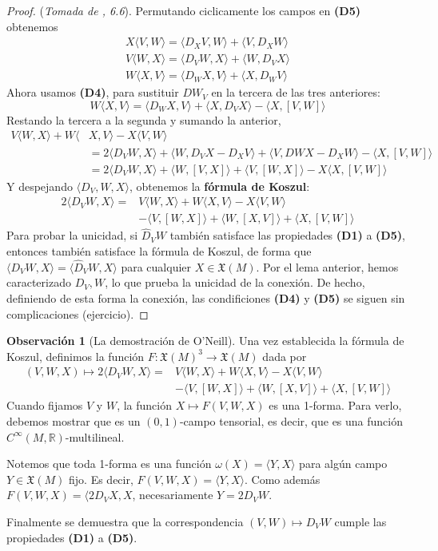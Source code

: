 \documentclass[spanish]{book}
\theoremstyle{definition}
\newtheorem*{obs}{Observación}
\newcommand{\R}{\mathbb{R}}
\newcommand{\X}{\mathfrak{X}}
\newcommand{\Cinf}{C^\infty}
\begin{document}
	
	\begin{proof}
		(\textit{Tomada de \cite{Loring-dif}, 6.6}). Permutando ciclicamente los campos en \textbf{(D5)} obtenemos
		\begin{align*}
			X\langle V,W\rangle=\langle D_XV,W\rangle+\langle V,D_XW\rangle\\
			V\langle W,X\rangle=\langle D_VW,X\rangle+\langle W,D_VX\rangle\\
			W\langle X,V\rangle=\langle D_WX,V\rangle+\langle X,D_WV\rangle
		\end{align*}
		Ahora usamos \textbf{(D4)}, para sustituir $DW_V$ en la tercera de las tres anteriores:
		\[W\langle X,V\rangle=\langle D_WX,V\rangle+\langle X,D_VX\rangle-\langle X,[V,W]\rangle\]
		Restando la tercera a la segunda y sumando la anterior,
		\begin{align*}
			V\langle W,X\rangle+W\langle &X,V\rangle-X\langle V,W\rangle\\
			&=2\langle D_VW,X\rangle+\langle W,D_VX-D_XV\rangle+\langle V,DWX-D_XW\rangle-\langle X,[V,W]\rangle\\
			&=2\langle D_VW,X\rangle+\langle W,[V,X]\rangle +\langle V,[W,X]\rangle-X\langle X,[V,W]\rangle
		\end{align*}
		Y despejando $\langle D_V,W,X\rangle$, obtenemos la \textbf{fórmula de Koszul}:
		\begin{align*}
			2\langle D_VW,X\rangle=&V\langle W,X\rangle+W\langle X,V\rangle-X\langle V,W\rangle\\
			&-\langle V,[W,X]\rangle+\langle W,[X,V]\rangle+\langle X,[V,W]\rangle
		\end{align*}
		Para probar la unicidad, si $\hat{D}_VW$ también satisface las propiedades \textbf{(D1)} a \textbf{(D5)}, entonces también satisface la fórmula de Koszul, de forma que $\langle D_VW,X\rangle=\langle \hat{D}_VW,X\rangle$ para cualquier $X\in\X(M)$. Por el lema anterior, hemos caracterizado $D_V,W$, lo que prueba la unicidad de la conexión. De hecho, definiendo de esta forma la conexión, las condificiones \textbf{(D4)} y \textbf{(D5)} se siguen sin complicaciones (ejercicio).
	\end{proof}
	\begin{obs}[La demostración de O'Neill]
		Una vez establecida la fórmula de Koszul, definimos la función $F:\X(M)^3\to\X(M)$ dada por
		\begin{align*}
			(V,W,X)\mapsto2\langle D_VW,X\rangle=&V\langle W,X\rangle+W\langle X,V\rangle-X\langle V,W\rangle\\
			&-\langle V,[W,X]\rangle+\langle W,[X,V]\rangle+\langle X,[V,W]\rangle
		\end{align*}
		Cuando fijamos $V$ y $W$, la función $X\mapsto F(V,W,X)$ es una 1-forma. Para verlo, debemos mostrar que es un $(0,1)$-campo tensorial, es decir, que es una función $\Cinf(M,\R)$-multilineal.
		
		Notemos que toda 1-forma es una función $\omega(X)=\langle Y,X\rangle$ para algún campo $Y\in\X(M)$ fijo. Es decir, $F(V,W,X)=\langle Y,X\rangle$. Como además $F(V,W,X)=\langle 2D_VX,X$, necesariamente $Y=2D_VW$.
		
		Finalmente se demuestra que la correspondencia $(V,W)\mapsto D_VW$ cumple las propiedades \textbf{(D1)} a \textbf{(D5)}.
	\end{obs}
\end{document}
